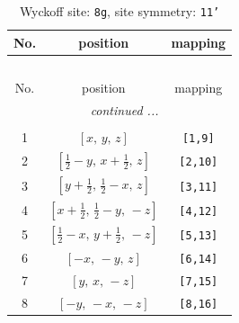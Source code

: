 \documentclass[fleqn,8pt]{jsarticle}
\begin{document}
\renewcommand{\arraystretch}{1.2}
\begin{longtable}{ccc}
\caption{Wyckoff site: {\tt 8g}, site symmetry: {\tt 11'}}
 \\
 \hline \hline
No. & position & mapping \\ \hline \endfirsthead

\multicolumn{2}{l}{\tablename\ \thetable{}} \\
 \hline \hline
No. & position & mapping \\ \hline \endhead

 \hline \hline
\multicolumn{2}{r}{\footnotesize\it continued ...} \\ \endfoot

 \hline \hline
\multicolumn{2}{r}{} \\ \endlastfoot

1 & $\left[ x,\, y,\, z \right]$ & {\tt [1,9]} \\ \hline
2 & $\left[ \frac{1}{2} - y,\, x + \frac{1}{2},\, z \right]$ & {\tt [2,10]} \\ \hline
3 & $\left[ y + \frac{1}{2},\, \frac{1}{2} - x,\, z \right]$ & {\tt [3,11]} \\ \hline
4 & $\left[ x + \frac{1}{2},\, \frac{1}{2} - y,\, - z \right]$ & {\tt [4,12]} \\ \hline
5 & $\left[ \frac{1}{2} - x,\, y + \frac{1}{2},\, - z \right]$ & {\tt [5,13]} \\ \hline
6 & $\left[ - x,\, - y,\, z \right]$ & {\tt [6,14]} \\ \hline
7 & $\left[ y,\, x,\, - z \right]$ & {\tt [7,15]} \\ \hline
8 & $\left[ - y,\, - x,\, - z \right]$ & {\tt [8,16]} \\
\end{longtable}
\end{document}
